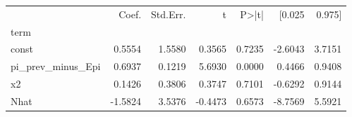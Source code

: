 \begin{tabular}{lrrrrrr}
\toprule
 & Coef. & Std.Err. & t & P>|t| & [0.025 & 0.975] \\
term &  &  &  &  &  &  \\
\midrule
const & 0.5554 & 1.5580 & 0.3565 & 0.7235 & -2.6043 & 3.7151 \\
pi_prev_minus_Epi & 0.6937 & 0.1219 & 5.6930 & 0.0000 & 0.4466 & 0.9408 \\
x2 & 0.1426 & 0.3806 & 0.3747 & 0.7101 & -0.6292 & 0.9144 \\
Nhat & -1.5824 & 3.5376 & -0.4473 & 0.6573 & -8.7569 & 5.5921 \\
\bottomrule
\end{tabular}
